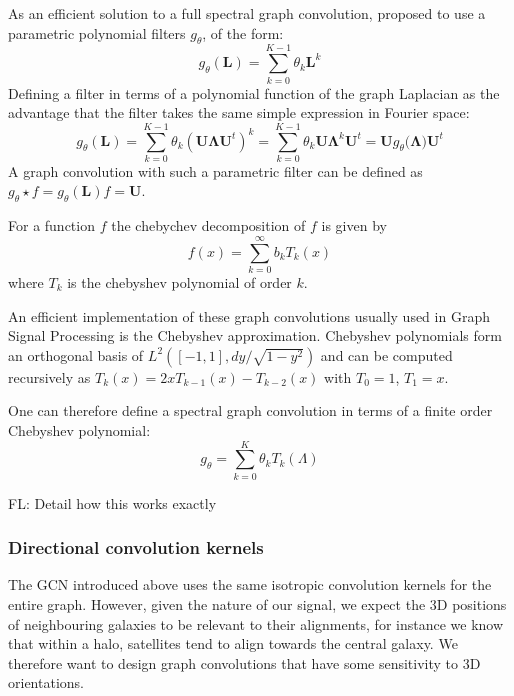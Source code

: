 \documentclass[a4paper,fleqn,usenatbib]{mnras}
\newcommand{\fl}[1]{{\color{magenta}FL: #1}}
\begin{document}
As an efficient solution to a  full spectral graph  convolution, \cite{Defferrard2016} proposed to use a parametric polynomial filters $g_\theta$, of the form:
\begin{equation}
	g_\theta(\mathbf{L}) = \sum_{k=0}^{K-1} \theta_k \mathbf{L}^k
\end{equation}
Defining a filter in  terms of a polynomial function of the graph Laplacian as the advantage that the filter takes the same simple expression in Fourier space: 
\begin{equation}
	g_\theta(\mathbf{L}) =  \sum_{k=0}^{K-1} \theta_k (\mathbf{U} \mathbf{\Lambda}  \mathbf{U}^t)^k  = \sum_{k=0}^{K-1} \theta_k \mathbf{U} \mathbf{\Lambda}^k \mathbf{U}^t =  \mathbf{U}  g_\theta(\mathbf{\Lambda)} \mathbf{U}^t 
\end{equation}
A graph convolution with such a parametric filter can be defined as $g_\theta \star f = g_\theta(\mathbf{L}) f = \mathbf{U} $.

For a function $f$ the chebychev decomposition of $f$ is given by 
\begin{equation}
	f(x) = \sum\limits_{k=0}^{\infty} b_{k} T_k(x)
\end{equation}
where $T_k$ is the  chebyshev polynomial of order $k$.

An efficient implementation of these graph convolutions usually used in Graph Signal Processing is the Chebyshev approximation. Chebyshev polynomials form an orthogonal basis of $L^2([-1,1], dy/\sqrt{1 - y^2})$ and can be computed recursively as $T_k(x) = 2x T_{k-1}(x) - T_{k-2}(x)$ with $T_0 =1$, $T_1 = x$.  

One can therefore define a spectral graph convolution in terms of a finite order Chebyshev polynomial:
\begin{equation}
	g_\theta = \sum_{k=0}^K \theta_k T_k(\Lambda)
\end{equation}

\fl{Detail how this works exactly}

\subsubsection{Directional convolution kernels}

The GCN introduced above uses the same isotropic convolution kernels for the entire graph. However, given the  nature of our signal, we expect the 3D positions of neighbouring galaxies to be relevant to their alignments, for instance we know that within a halo, satellites tend to align towards the central galaxy. We therefore want to design graph convolutions that have some sensitivity to 3D orientations. 
\end{document}
